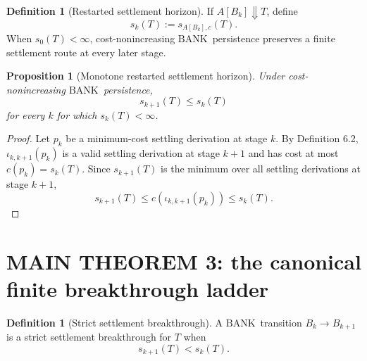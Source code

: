 \documentclass[11pt]{article}
\newtheorem{proposition}[theorem]{Proposition}
\theoremstyle{definition}
\newtheorem{definition}[theorem]{Definition}
\newcommand{\BANK}{\ensuremath{\mathrm{BANK}}}
\begin{document}
\begin{definition}[Restarted settlement horizon]
If $A[B_k]\Downarrow T$, define
\[
s_k(T):=s_{A[B_k],c}(T).
\]
When $s_0(T)<\infty$, cost-nonincreasing \BANK\ persistence preserves a finite settlement route at every later stage.
\end{definition}

\begin{proposition}[Monotone restarted settlement horizon]
Under cost-nonincreasing \BANK\ persistence,
\[
s_{k+1}(T)\le s_k(T)
\]
for every $k$ for which $s_k(T)<\infty$.
\end{proposition}

\begin{proof}
Let $p_k$ be a minimum-cost settling derivation at stage $k$. By Definition 6.2, $\iota_{k,k+1}(p_k)$ is a valid settling derivation at stage $k+1$ and has cost at most $c(p_k)=s_k(T)$. Since $s_{k+1}(T)$ is the minimum over all settling derivations at stage $k+1$,
\[
s_{k+1}(T)\le c(\iota_{k,k+1}(p_k))\le s_k(T).
\]
\end{proof}

\section{MAIN THEOREM 3: the canonical finite breakthrough ladder}
\begin{definition}[Strict settlement breakthrough]
A \BANK\ transition $B_k\to B_{k+1}$ is a strict settlement breakthrough for $T$ when
\[
s_{k+1}(T)<s_k(T).
\]
\end{definition}
\end{document}
